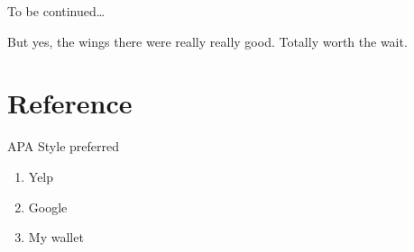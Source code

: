 \documentclass[
]{article}
\providecommand{\tightlist}{%
  \setlength{\itemsep}{0pt}\setlength{\parskip}{0pt}}
\begin{document}
To be continued\ldots{}

But yes, the wings there were really really good. Totally worth the
wait.

\hypertarget{reference}{%
\section{Reference}\label{reference}}

APA Style preferred

\begin{enumerate}
\def\labelenumi{\arabic{enumi}.}
\tightlist
\item
  Yelp
\item
  Google
\item
  My wallet
\end{enumerate}
\end{document}
